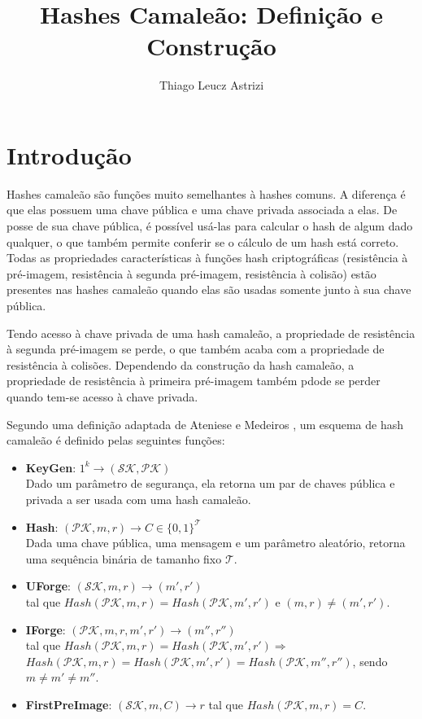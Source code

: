 \documentclass[a4paper]{article}
\title{Hashes Camaleão: Definição e Construção}
\author{Thiago Leucz Astrizi}
\begin{document}
\maketitle

\section{Introdução}

Hashes camaleão são funções muito semelhantes à hashes comuns. A
diferença é que elas possuem uma chave pública e uma chave privada
associada a elas. De posse de sua chave pública, é possível usá-las
para calcular o hash de algum dado qualquer, o que também permite
conferir se o cálculo de um hash está correto. Todas as propriedades
características à funções hash criptográficas (resistência à
pré-imagem, resistência à segunda pré-imagem, resistência à colisão)
estão presentes nas hashes camaleão quando elas são usadas somente
junto à sua chave pública.

Tendo acesso à chave privada de uma hash camaleão, a propriedade de
resistência à segunda pré-imagem se perde, o que também acaba com a
propriedade de resistência à colisões. Dependendo da construção da
hash camaleão, a propriedade de resistência à primeira pré-imagem
também pdode se perder quando tem-se acesso à chave privada.

Segundo uma definição adaptada de Ateniese e Medeiros \cite{ateniese},
um esquema de hash camaleão é definido pelas seguintes funções:

\begin{itemize}
\item\textbf{KeyGen}: $1^k \rightarrow (\mathcal{SK}, \mathcal{PK})$\\
  Dado um parâmetro de segurança, ela retorna um par de chaves pública
  e privada a ser usada com uma hash camaleão.
\item\textbf{Hash}: $(\mathcal{PK}, m, r) \rightarrow C \in \{0,
  1\}^\mathcal{T}$ \\ Dada uma chave pública, uma mensagem e um parâmetro
  aleatório, retorna uma sequência binária de tamanho fixo $\mathcal{T}$.
\item\textbf{UForge}: $(\mathcal{SK}, m, r) \rightarrow (m',
  r')$\\ tal que $Hash(\mathcal{PK}, m, r) = Hash(\mathcal{PK}, m',
  r')$ e $(m, r) \neq (m', r')$.
\item\textbf{IForge}: $(\mathcal{PK}, m, r, m', r') \rightarrow (m'',
  r'')$\\ tal que $Hash(\mathcal{PK}, m, r) = Hash(\mathcal{PK}, m',
  r') \Longrightarrow$\\ $Hash(\mathcal{PK}, m, r) = Hash(\mathcal{PK}, m',
  r') = Hash(\mathcal{PK}, m'', r'')$, sendo $m \neq m' \neq m''$.
\item\textbf{FirstPreImage}: $(\mathcal{SK}, m, C) \rightarrow r$
  tal que $Hash(\mathcal{PK}, m, r) = C$.
\end{itemize}
\end{document}
